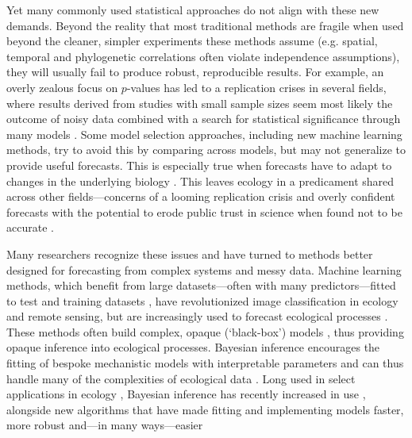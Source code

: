 \documentclass[11pt]{article}
\newcommand{\R}[1]{\label{}\linelabel{#1}}
\begin{document}
Yet many commonly used statistical approaches do not align with these new demands. Beyond the reality that most traditional methods are fragile when used beyond the cleaner, simpler experiments these methods assume (e.g. spatial, temporal and phylogenetic correlations often violate independence assumptions), they will usually fail to produce robust, reproducible results. For example, an overly zealous focus on $p$-values has led to a replication crises in several fields, where results derived from studies with small sample sizes seem most likely the outcome of noisy data combined with a search for statistical significance through many models \citep[effectively a garden of forking paths,][]{halsey2015,loken2017}. Some model selection approaches, including new machine learning methods, try to avoid this by comparing across models, but may not generalize to provide useful forecasts. This is especially true when forecasts have to adapt to changes in the underlying biology  \citep{boettiger2022forecast}. This leaves ecology in a predicament shared across other fields---concerns of a looming replication crisis \citep{filazzola2021replication,fraser2020role} and overly confident forecasts with the potential to erode public trust in science when found not to be accurate \citep{leroux2019prevalence,boettiger2022forecast}. 

Many researchers recognize these issues and have turned to methods better designed for forecasting from complex systems and messy data. Machine learning methods, which benefit from large datasets---often with many predictors---fitted to test and training datasets \citep{breiman2001statistical}, have revolutionized image classification in ecology and remote sensing, but are increasingly used to forecast ecological processes \citep[e.g.,][]{zwart2023near}. These methods often build complex, opaque (`black-box') models \citep{CoxTwoCultures,EfronTwoCultures,shmueli2010explain}, thus providing opaque inference into ecological processes.  \R{Rnewmodels}Bayesian inference \R{rrinference}encourages the fitting of bespoke mechanistic models with interpretable parameters and can thus handle many of the complexities of ecological data \citep{hobbs2006alternatives}. Long used in select applications in ecology \citep{muthuku2008,zheng2007,trijoulet2018,strinella2020potential}, Bayesian inference has recently increased in use \citep{anderson2021trends,pichler2023machine}, alongside new algorithms \citep[e.g. Hamiltonian Monte Carlo,][]{nuts2014,betan2019} that have made fitting and implementing models faster, more robust and---in many ways---easier \citep{Carpenter:2017stan}
\end{document}
